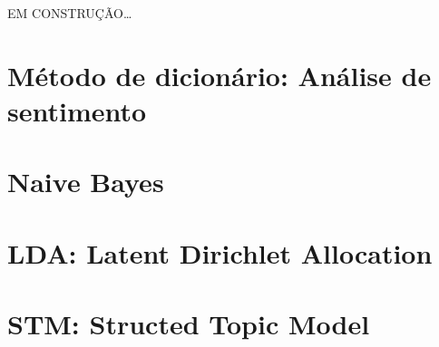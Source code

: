 \documentclass[]{book}
\begin{document}
EM CONSTRUÇÃO\ldots{}

\hypertarget{muxe9todo-de-dicionuxe1rio-anuxe1lise-de-sentimento}{%
\section{Método de dicionário: Análise de sentimento}\label{muxe9todo-de-dicionuxe1rio-anuxe1lise-de-sentimento}}

\hypertarget{naive-bayes}{%
\section{Naive Bayes}\label{naive-bayes}}

\hypertarget{lda-latent-dirichlet-allocation}{%
\section{LDA: Latent Dirichlet Allocation}\label{lda-latent-dirichlet-allocation}}

\hypertarget{stm-structed-topic-model}{%
\section{STM: Structed Topic Model}\label{stm-structed-topic-model}}


\end{document}
